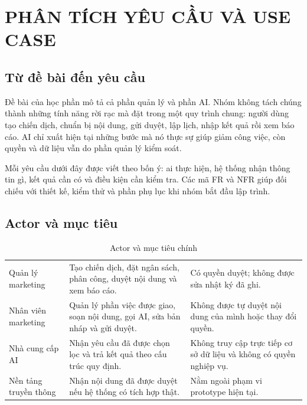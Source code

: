 \chapter{PHÂN TÍCH YÊU CẦU VÀ USE CASE}

\section{Từ đề bài đến yêu cầu}

Đề bài của học phần mô tả cả phần quản lý và phần AI. Nhóm không tách chúng thành những tính năng rời rạc mà đặt trong một quy trình chung: người dùng tạo chiến dịch, chuẩn bị nội dung, gửi duyệt, lập lịch, nhập kết quả rồi xem báo cáo. AI chỉ xuất hiện tại những bước mà nó thực sự giúp giảm công việc, còn quyền và dữ liệu vẫn do phần quản lý kiểm soát.

Mỗi yêu cầu dưới đây được viết theo bốn ý: ai thực hiện, hệ thống nhận thông tin gì, kết quả cần có và điều kiện cần kiểm tra. Các mã FR và NFR giúp đối chiếu với thiết kế, kiểm thử và phần phụ lục khi nhóm bắt đầu lập trình.

\section{Actor và mục tiêu}

\begin{table}[h!]
\centering
\small
\caption{Actor và mục tiêu chính}
\label{tab:v8-actors}
\begin{tabularx}{\textwidth}{|L{3.0cm}|Y|Y|}
\hline
{} &  & \\
\hline
Quản lý marketing & Tạo chiến dịch, đặt ngân sách, phân công, duyệt nội dung và xem báo cáo. & Có quyền duyệt; không được sửa nhật ký đã ghi.\\
\hline
Nhân viên marketing & Quản lý phần việc được giao, soạn nội dung, gọi AI, sửa bản nháp và gửi duyệt. & Không được tự duyệt nội dung của mình hoặc thay đổi quyền.\\
\hline
Nhà cung cấp AI & Nhận yêu cầu đã được chọn lọc và trả kết quả theo cấu trúc quy định. & Không truy cập trực tiếp cơ sở dữ liệu và không có quyền nghiệp vụ.\\
\hline
Nền tảng truyền thông & Nhận nội dung đã được duyệt nếu hệ thống có tích hợp thật. & Nằm ngoài phạm vi prototype hiện tại.\\
\hline
\end{tabularx}
\end{table}

